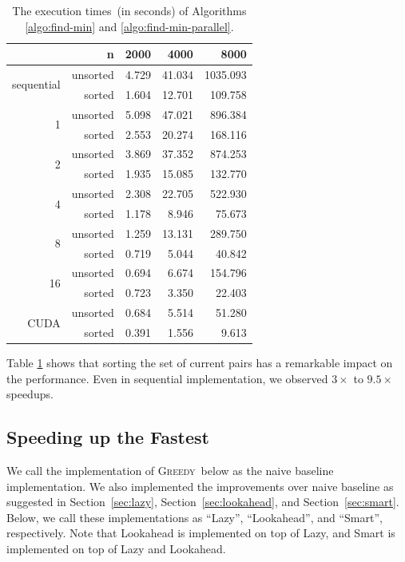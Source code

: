 \documentclass[12pt]{article}
\newcommand{\greedyAlgo}{\textsc{Greedy}}
\begin{document}
\begin{table}[ht]
	\center
	\begin{tabular}{rr|rrr}
		& n & 2000 & 4000 & 8000\\\hline
		\multirow{2}{*}{sequential} & unsorted & 4.729 & 41.034 & 1035.093\\
		& sorted & 1.604 & 12.701 & 109.758\\\hline
		\multirow{2}{*}{1} & unsorted & 5.098 & 47.021 & 896.384\\
		& sorted & 2.553 & 20.274 & 168.116\\\hline
		\multirow{2}{*}{2} & unsorted & 3.869 & 37.352 & 874.253\\
		& sorted & 1.935 & 15.085 & 132.770\\\hline
		\multirow{2}{*}{4} & unsorted & 2.308 & 22.705 & 522.930\\
		& sorted & 1.178 & 8.946 & 75.673\\\hline
		\multirow{2}{*}{8} & unsorted & 1.259 & 13.131 & 289.750\\
		& sorted & 0.719 & 5.044 & 40.842\\\hline
		\multirow{2}{*}{16} & unsorted & 0.694 & 6.674 & 154.796\\
		& sorted & 0.723 & 3.350 & 22.403\\\hline
		\multirow{2}{*}{CUDA} & unsorted & 0.684 & 5.514 & 51.280\\
		& sorted & 0.391 & 1.556 & 9.613
	\end{tabular}
	\caption{The execution times~(in seconds) of  Algorithms \ref{algo:find-min} and \ref{algo:find-min-parallel}.}
	\label{table:phase-2-time}
\end{table}

Table \ref{table:phase-2-time} shows that sorting the set of current pairs has a remarkable impact on the performance. Even in sequential implementation, we observed $3\times$ to $9.5\times$ speedups.

\subsection{Speeding up the Fastest}

We call the implementation of \greedyAlgo\ below as the naive baseline implementation. We also implemented the improvements over naive baseline as suggested in Section~\ref{sec:lazy}, Section~\ref{sec:lookahead}, and Section~\ref{sec:smart}. Below, we call these implementations as ``Lazy'', ``Lookahead'', and ``Smart'', respectively. Note that Lookahead is implemented on top of Lazy, and Smart is implemented on top of Lazy and Lookahead.
\end{document}
